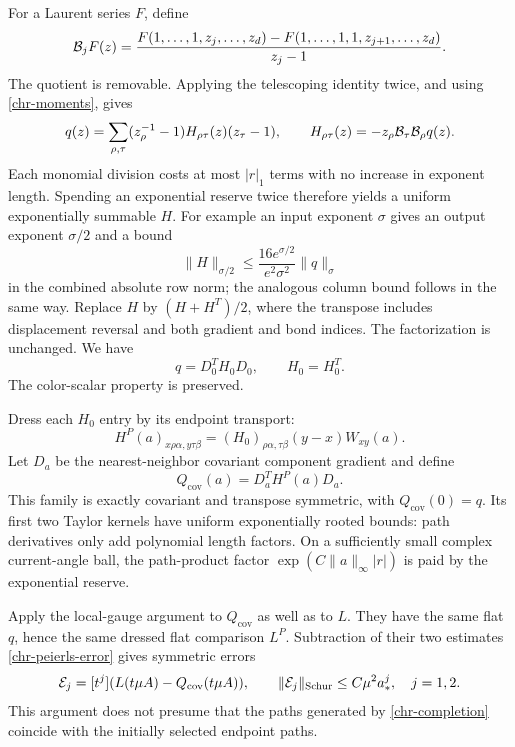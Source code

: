 For a Laurent series \(F\), define
\[
 {\cal B}_jF(z)=
 \frac{F(1,\ldots,1,z_j,\ldots,z_d)
       -F(1,\ldots,1,1,z_{j+1},\ldots,z_d)}{z_j-1}.
\]
The quotient is removable.  Applying the telescoping identity
twice, and using \eqref{chr-moments}, gives
\begin{equation}
 q(z)=\sum_{\rho,\tau}(z_\rho^{-1}-1)
       H_{\rho\tau}(z)(z_\tau-1),\qquad
 H_{\rho\tau}(z)=-z_\rho{\cal B}_\tau{\cal B}_\rho q(z).
 \label{chr-laurent}
\end{equation}
Each monomial division costs at most \(|r|_1\) terms with no
increase in exponent length.  Spending an exponential reserve
twice therefore yields a uniform exponentially summable \(H\).
For example an input exponent \(\sigma\) gives an output
exponent \(\sigma/2\) and a bound
\[
 \|H\|_{\sigma/2}
 \leq \frac{16e^{\sigma/2}}{e^2\sigma^2}\|q\|_\sigma
\]
in the combined absolute row norm; the analogous column bound
follows in the same way.  Replace \(H\) by \((H+H^T)/2\), where
the transpose includes displacement reversal and both gradient
and bond indices.  The factorization is unchanged.  We have
\begin{equation}
                  q=D_0^TH_0D_0,\qquad H_0=H_0^T.
 \label{chr-flat-factor}
\end{equation}
The color-scalar property is preserved.

Dress each \(H_0\) entry by its endpoint transport:
\[
 H^P(a)_{x\rho\alpha,y\tau\beta}
       =(H_0)_{\rho\alpha,\tau\beta}(y-x)W_{xy}(a).
\]
Let \(D_a\) be the nearest-neighbor covariant component gradient
and define
\begin{equation}
                  Q_{\mathrm{cov}}(a)
                   =D_a^TH^P(a)D_a .
 \label{chr-completion}
\end{equation}
This family is exactly covariant and transpose symmetric, with
\(Q_{\mathrm{cov}}(0)=q\).  Its first two Taylor kernels have
uniform exponentially rooted bounds: path derivatives only add
polynomial length factors.  On a sufficiently small complex
current-angle ball, the path-product factor
\(\exp(C\|a\|_\infty|r|)\) is paid by the exponential reserve.

Apply the local-gauge argument to \(Q_{\mathrm{cov}}\) as well
as to \(L\).  They have the same flat \(q\), hence the same dressed
flat comparison \(L^P\).  Subtraction of their two estimates
\eqref{chr-peierls-error} gives symmetric errors
\begin{equation}
 {\cal E}_j=[t^j](L(t\mu A)-Q_{\mathrm{cov}}(t\mu A)),
 \qquad
 \|{\cal E}_j\|_{\mathrm{Schur}}
           \leq C\mu^2a_*^j,\quad j=1,2.
 \label{chr-completion-error}
\end{equation}
This argument does not presume that the paths generated by
\eqref{chr-completion} coincide with the initially selected
endpoint paths.


